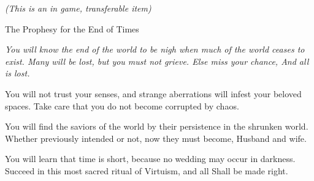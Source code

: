 \documentclass[white]{guildcamp1}
\begin{document}
\name{\wProphesy{}}

\emph{(This is an in game, transferable item)}

\begin{center}The Prophesy for the End of Times

{\it You will know the end of the world to be nigh when much of the world ceases to exist.
Many will be lost, but you must not grieve. Else miss your chance,
And all is lost.

You will not trust your senses, and strange aberrations will infest your beloved spaces. 
Take care that you do not become corrupted 
by chaos.

You will find the saviors of the world by their persistence in the shrunken world.
Whether previously intended or not, now they must become,
Husband and wife.

You will learn that time is short, because no wedding may occur in darkness.
Succeed in this most sacred ritual of Virtuism, and all
Shall be made right.}
\end{center}
\end{document}
